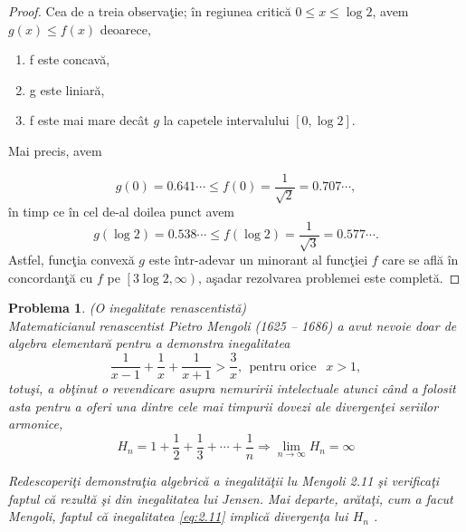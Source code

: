 \documentclass[a4paper,12pt,oneside]{report}
\newtheorem{problem}{Problema}
\begin{document}
\begin{proof}
Cea de a treia observa\c{t}ie; \^{i}n regiunea critic\u{a} \(0\leq  x \leq \log2\), avem \(g\left ( x \right ) \leq  f\left ( x \right )\) deoarece,

\begin{enumerate}
  \item f este concav\u{a},
  \item g este liniar\u{a},
  \item f este mai mare dec\^{a}t \(g\) la capetele intervalului \(\left [ 0 , \log 2 \right ]\).
\end{enumerate}

Mai precis, avem

\begin{displaymath}
  g\left ( 0 \right ) = 0.641\cdots \leq f\left ( 0 \right ) = \frac{1}{\sqrt{2}} = 0.707\cdots,
\end{displaymath}
\^{i}n timp ce \^{i}n cel de-al doilea punct avem
\begin{displaymath}
  g\left ( \log 2 \right ) = 0.538\cdots  \leq f\left ( \log2 \right ) = \frac{1}{\sqrt{3}} = 0.577\cdots.
\end{displaymath}
Astfel, func\c{t}ia convex\u{a} \(g\) este \^{i}ntr-adevar un minorant al func\c{t}iei \(f\) care se afl\u{a} \^{i}n concordan\c{t}\u{a} cu \(f\) pe \(\left [ 3\log 2 , \infty  \right )\), a\c{s}adar rezolvarea problemei este complet\u{a}.
\end{proof}
\begin{problem} (O inegalitate renascentist\u{a})\\
   Matematicianul renascentist Pietro Mengoli (1625 – 1686) a avut nevoie doar de algebra elementar\u{a} pentru a demonstra inegalitatea
 \begin{displaymath}
   \frac{1}{x - 1} + \frac{1}{x} + \frac{1}{x + 1} > \frac{3}{x} , ~~ \text{pentru orice } ~~  x > 1, \label{eq:2.11} \tag{2.11}
 \end{displaymath}
totu\c{s}i, a ob\c{t}inut o revendicare asupra nemuririi intelectuale atunci c\^{a}nd a folosit asta pentru a oferi una dintre cele mai timpurii dovezi ale divergen\c{t}ei seriilor armonice,
\begin{displaymath}
  H_{n} = 1 + \frac{1}{2} + \frac{1}{3} + \cdots + \frac{1}{n} \Rightarrow \lim_{n \to \infty } H_{n} = \infty \label{eq:2.12} \tag{2.12}
\end{displaymath}

Redescoperi\c{t}i demonstra\c{t}ia algebric\u{a} a inegalit\u{a}\c{t}ii lu Mengoli 2.11 \c{s}i verifica\c{t}i faptul c\u{a} rezult\u{a} \c{s}i din inegalitatea lui Jensen. Mai departe, ar\u{a}ta\c{t}i, cum a facut Mengoli, faptul c\u{a} inegalitatea \ref{eq:2.11} implic\u{a} divergen\c{t}a lui \(H_{n}\) .
\end{problem}
\end{document}
